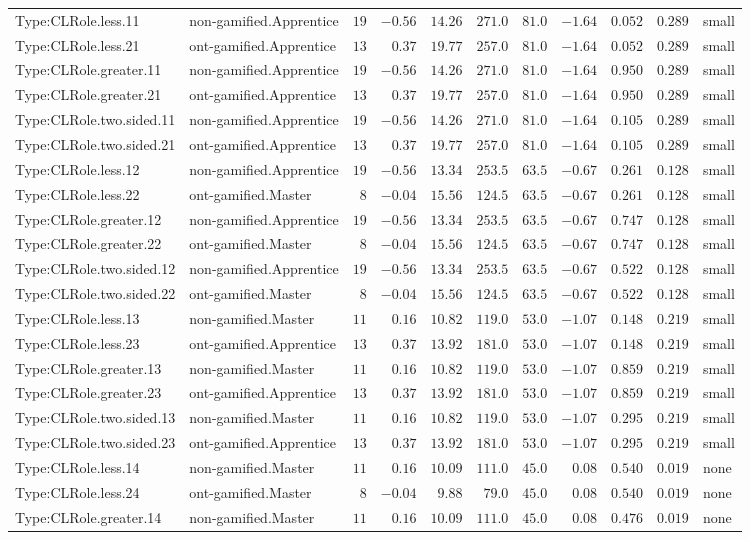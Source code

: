 \documentclass[6pt,a4paper]{article}
\begin{document}
{\begin{longtable}{llrrrrrrrrl}
Type:CLRole.less.11&non-gamified.Apprentice&$19$&$-0.56$&$14.26$&$271.0$&$ 81.0$&$-1.64$&$0.052$&$0.289$&small\tabularnewline
Type:CLRole.less.21&ont-gamified.Apprentice&$13$&$ 0.37$&$19.77$&$257.0$&$ 81.0$&$-1.64$&$0.052$&$0.289$&small\tabularnewline
Type:CLRole.greater.11&non-gamified.Apprentice&$19$&$-0.56$&$14.26$&$271.0$&$ 81.0$&$-1.64$&$0.950$&$0.289$&small\tabularnewline
Type:CLRole.greater.21&ont-gamified.Apprentice&$13$&$ 0.37$&$19.77$&$257.0$&$ 81.0$&$-1.64$&$0.950$&$0.289$&small\tabularnewline
Type:CLRole.two.sided.11&non-gamified.Apprentice&$19$&$-0.56$&$14.26$&$271.0$&$ 81.0$&$-1.64$&$0.105$&$0.289$&small\tabularnewline
Type:CLRole.two.sided.21&ont-gamified.Apprentice&$13$&$ 0.37$&$19.77$&$257.0$&$ 81.0$&$-1.64$&$0.105$&$0.289$&small\tabularnewline
Type:CLRole.less.12&non-gamified.Apprentice&$19$&$-0.56$&$13.34$&$253.5$&$ 63.5$&$-0.67$&$0.261$&$0.128$&small\tabularnewline
Type:CLRole.less.22&ont-gamified.Master&$ 8$&$-0.04$&$15.56$&$124.5$&$ 63.5$&$-0.67$&$0.261$&$0.128$&small\tabularnewline
Type:CLRole.greater.12&non-gamified.Apprentice&$19$&$-0.56$&$13.34$&$253.5$&$ 63.5$&$-0.67$&$0.747$&$0.128$&small\tabularnewline
Type:CLRole.greater.22&ont-gamified.Master&$ 8$&$-0.04$&$15.56$&$124.5$&$ 63.5$&$-0.67$&$0.747$&$0.128$&small\tabularnewline
Type:CLRole.two.sided.12&non-gamified.Apprentice&$19$&$-0.56$&$13.34$&$253.5$&$ 63.5$&$-0.67$&$0.522$&$0.128$&small\tabularnewline
Type:CLRole.two.sided.22&ont-gamified.Master&$ 8$&$-0.04$&$15.56$&$124.5$&$ 63.5$&$-0.67$&$0.522$&$0.128$&small\tabularnewline
Type:CLRole.less.13&non-gamified.Master&$11$&$ 0.16$&$10.82$&$119.0$&$ 53.0$&$-1.07$&$0.148$&$0.219$&small\tabularnewline
Type:CLRole.less.23&ont-gamified.Apprentice&$13$&$ 0.37$&$13.92$&$181.0$&$ 53.0$&$-1.07$&$0.148$&$0.219$&small\tabularnewline
Type:CLRole.greater.13&non-gamified.Master&$11$&$ 0.16$&$10.82$&$119.0$&$ 53.0$&$-1.07$&$0.859$&$0.219$&small\tabularnewline
Type:CLRole.greater.23&ont-gamified.Apprentice&$13$&$ 0.37$&$13.92$&$181.0$&$ 53.0$&$-1.07$&$0.859$&$0.219$&small\tabularnewline
Type:CLRole.two.sided.13&non-gamified.Master&$11$&$ 0.16$&$10.82$&$119.0$&$ 53.0$&$-1.07$&$0.295$&$0.219$&small\tabularnewline
Type:CLRole.two.sided.23&ont-gamified.Apprentice&$13$&$ 0.37$&$13.92$&$181.0$&$ 53.0$&$-1.07$&$0.295$&$0.219$&small\tabularnewline
Type:CLRole.less.14&non-gamified.Master&$11$&$ 0.16$&$10.09$&$111.0$&$ 45.0$&$ 0.08$&$0.540$&$0.019$&none\tabularnewline
Type:CLRole.less.24&ont-gamified.Master&$ 8$&$-0.04$&$ 9.88$&$ 79.0$&$ 45.0$&$ 0.08$&$0.540$&$0.019$&none\tabularnewline
Type:CLRole.greater.14&non-gamified.Master&$11$&$ 0.16$&$10.09$&$111.0$&$ 45.0$&$ 0.08$&$0.476$&$0.019$&none\tabularnewline

\end{longtable}}
\end{document}
